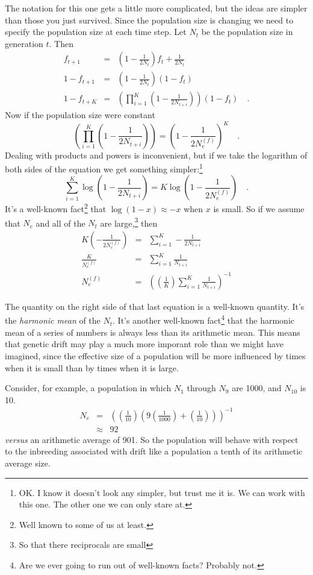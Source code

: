 The notation for this one gets a little more complicated, but the
ideas are simpler than those you just survived. Since the population
size is changing we need to specify the population size at each time
step. Let $N_t$ be the population size in generation $t$. Then
\begin{eqnarray*}
f_{t+1} &=& \left(1-\frac{1}{2N_t}\right)f_t + \frac{1}{2N_t} \\
1 - f_{t+1} &=& \left(1-\frac{1}{2N_t}\right)(1-f_t) \\
1 - f_{t+K} &=&
\left(\prod_{i=1}^K\left(1-\frac{1}{2N_{t+i}}\right)\right)(1-f_t) \quad .
\end{eqnarray*}
Now if the population size were constant
\[
\left(\prod_{i=1}^K\left(1-\frac{1}{2N_{t+i}}\right)\right) =
\left(1 - \frac{1}{2N_e^{(f)}}\right)^K \quad .
\]
Dealing with products and powers is inconvenient, but if we take the
logarithm of both sides of the equation we get something
simpler:\footnote{OK. I know it doesn't look any simpler, but trust me
  it is. We can work with this one. The other one we can only stare
  at.} 
\[
\sum_{i=1}^K\log\left(1-\frac{1}{2N_{t+i}}\right) =
K\log\left(1 - \frac{1}{2N_e^{(f)}}\right) \quad .
\]
It's a well-known fact\footnote{Well known to some of us at least.}
that $\log(1-x) \approx -x$ when $x$ is small. So if we assume that
$N_e$ and all of the $N_{t}$ are large,\footnote{So that there
  reciprocals are small} then
\begin{eqnarray*}
K\left(-\frac{1}{2N_e^{(f)}}\right)
  &=& \sum_{i=1}^K-\frac{1}{2N_{t+i}} \\
\frac{K}{N_e^{(f)}} &=& \sum_{i=1}^K\frac{1}{N_{t+i}} \\
N_e^{(f)} &=& \left(\left(\frac{1}{K}\right)
                    \sum_{i=1}^K\frac{1}{N_{t+i}}\right)^{-1}
\end{eqnarray*}

The quantity on the right side of that last equation is a well-known
quantity. It's the {\it harmonic mean} of the $N_{t}$.  It's another
well-known fact\footnote{Are we ever going to run out of well-known
  facts? Probably not.} that the harmonic mean of a series of numbers
is always less than its arithmetic mean. This means that genetic drift
may play a much more imporant role than we might have imagined, since
the effective size of a population will be more influenced by times
when it is small than by times when it is large.

Consider, for example, a population in which $N_1$ through $N_9$ are
1000, and $N_{10}$ is 10.
\begin{eqnarray*}
N_e &=& \left(\left(\frac{1}{10}\right)
            \left(9\left(\frac{1}{1000}\right) +
                   \left(\frac{1}{10}\right)\right)\right)^{-1} \\
    &\approx& 92
\end{eqnarray*}
{\it versus\/} an arithmetic average of 901. So the population will
behave with respect to the inbreeding associated with drift like a
population a tenth of its arithmetic average size.

